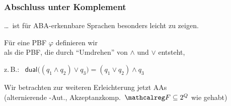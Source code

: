   \begin{frame}
    \frametitle{Abschluss unter Komplement}
    
    \dots\ ist für ABA-erkennbare Sprachen besonders leicht zu zeigen.
    
    \parIII
    Für eine PBF $\varphi$ definieren wir  \\
    als die PBF, die durch "`Umdrehen"' von $\land$ und $\lor$ entsteht,
    
    \parI
    z.\,B.:~ $\textsf{dual}\big((q_1 \land q_2) \lor q_3\big) = (q_1 \lor q_2) \land q_3$
    
    \parIII
    Wir betrachten zur weiteren Erleichterung jetzt AAs \\
    (alternierende -Aut., Akzeptanzkomp.\ $\calF \subseteq 2^Q$ wie gehabt)
    
  \end{frame}
  

